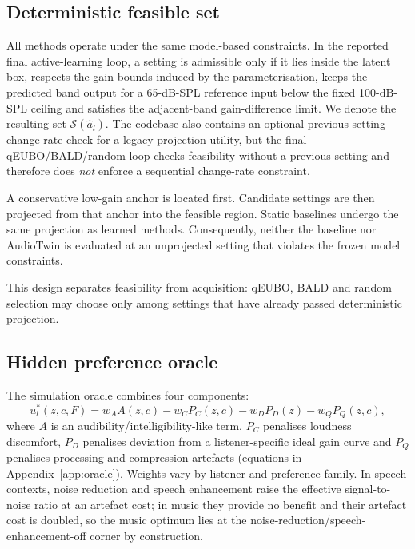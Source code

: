 \documentclass[preprint,12pt]{elsarticle}
\begin{document}
\subsection{Deterministic feasible set}

All methods operate under the same model-based constraints. In the reported final active-learning loop, a setting is admissible only if it lies inside the latent box, respects the gain bounds induced by the parameterisation, keeps the predicted band output for a 65-dB-SPL reference input below the fixed 100-dB-SPL ceiling and satisfies the adjacent-band gain-difference limit. We denote the resulting set $\mathcal S(\hat a_l)$. The codebase also contains an optional previous-setting change-rate check for a legacy projection utility, but the final qEUBO/BALD/random loop checks feasibility without a previous setting and therefore does \emph{not} enforce a sequential change-rate constraint.

A conservative low-gain anchor is located first. Candidate settings are then projected from that anchor into the feasible region. Static baselines undergo the same projection as learned methods. Consequently, neither the baseline nor AudioTwin is evaluated at an unprojected setting that violates the frozen model constraints.

This design separates feasibility from acquisition: qEUBO, BALD and random selection may choose only among settings that have already passed deterministic projection.

\subsection{Hidden preference oracle}
\label{sec:oracle}

The simulation oracle combines four components:
\begin{equation}
 u_l^*(z,c,F)=w_A A(z,c)-w_C P_C(z,c)-w_D P_D(z)-w_Q P_Q(z,c),
 \label{eq:oracle}
\end{equation}
where $A$ is an audibility/intelligibility-like term, $P_C$ penalises loudness discomfort, $P_D$ penalises deviation from a listener-specific ideal gain curve and $P_Q$ penalises processing and compression artefacts (equations in Appendix~\ref{app:oracle}). Weights vary by listener and preference family. In speech contexts, noise reduction and speech enhancement raise the effective signal-to-noise ratio at an artefact cost; in music they provide no benefit and their artefact cost is doubled, so the music optimum lies at the noise-reduction/speech-enhancement-off corner by construction.
\end{document}

